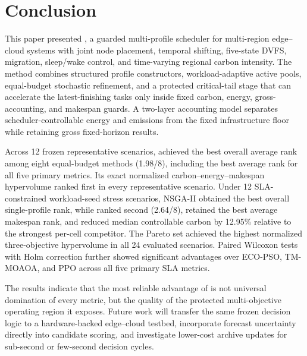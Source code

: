 \section{Conclusion}
\label{sec:conclusion}

This paper presented \method, a guarded multi-profile scheduler for multi-region edge--cloud systems with joint node placement, temporal shifting, five-state DVFS, migration, sleep/wake control, and time-varying regional carbon intensity. The method combines structured profile constructors, workload-adaptive active pools, equal-budget stochastic refinement, and a protected critical-tail stage that can accelerate the latest-finishing tasks only inside fixed carbon, energy, gross-accounting, and makespan guards. A two-layer accounting model separates scheduler-controllable energy and emissions from the fixed infrastructure floor while retaining gross fixed-horizon results.

Across 12 frozen representative scenarios, \method achieved the best overall average rank among eight equal-budget methods (1.98/8), including the best average rank for all five primary metrics. Its exact normalized carbon--energy--makespan hypervolume ranked first in every representative scenario. Under 12 SLA-constrained workload-seed stress scenarios, NSGA-II obtained the best overall single-profile rank, while \method ranked second (2.64/8), retained the best average makespan rank, and reduced median controllable carbon by 12.95\% relative to the strongest per-cell competitor. The \method Pareto set achieved the highest normalized three-objective hypervolume in all 24 evaluated scenarios. Paired Wilcoxon tests with Holm correction further showed significant advantages over ECO-PSO, TM-MOAOA, and PPO across all five primary SLA metrics.

The results indicate that the most reliable advantage of \method is not universal domination of every metric, but the quality of the protected multi-objective operating region it exposes. Future work will transfer the same frozen decision logic to a hardware-backed edge--cloud testbed, incorporate forecast uncertainty directly into candidate scoring, and investigate lower-cost archive updates for sub-second or few-second decision cycles.
